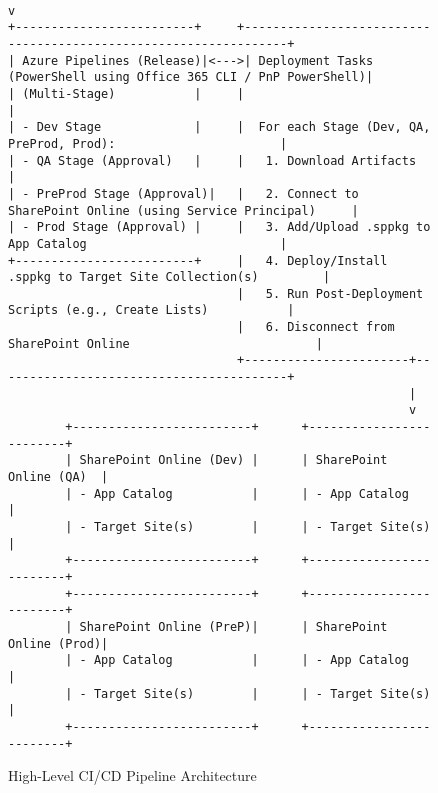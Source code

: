 \begin{figure}[htbp]
\begin{verbatim}
                                                                 v
+-------------------------+     +-----------------------------------------------------------------+
| Azure Pipelines (Release)|<--->| Deployment Tasks (PowerShell using Office 365 CLI / PnP PowerShell)|
| (Multi-Stage)           |     |                                                                 |
| - Dev Stage             |     |  For each Stage (Dev, QA, PreProd, Prod):                       |
| - QA Stage (Approval)   |     |   1. Download Artifacts                                         |
| - PreProd Stage (Approval)|   |   2. Connect to SharePoint Online (using Service Principal)     |
| - Prod Stage (Approval) |     |   3. Add/Upload .sppkg to App Catalog                           |
+-------------------------+     |   4. Deploy/Install .sppkg to Target Site Collection(s)         |
                                |   5. Run Post-Deployment Scripts (e.g., Create Lists)           |
                                |   6. Disconnect from SharePoint Online                          |
                                +-----------------------+-----------------------------------------+
                                                        |
                                                        v
        +-------------------------+      +-------------------------+
        | SharePoint Online (Dev) |      | SharePoint Online (QA)  |
        | - App Catalog           |      | - App Catalog           |
        | - Target Site(s)        |      | - Target Site(s)        |
        +-------------------------+      +-------------------------+
        +-------------------------+      +-------------------------+
        | SharePoint Online (PreP)|      | SharePoint Online (Prod)|
        | - App Catalog           |      | - App Catalog           |
        | - Target Site(s)        |      | - Target Site(s)        |
        +-------------------------+      +-------------------------+
    \end{verbatim}
    \caption{High-Level CI/CD Pipeline Architecture}
    \label{fig:HighLevelArchitecture}
\end{figure}

